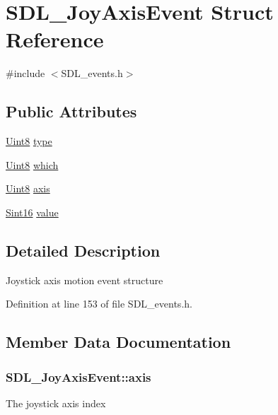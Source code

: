 \hypertarget{struct_s_d_l___joy_axis_event}{}\section{S\+D\+L\+\_\+\+Joy\+Axis\+Event Struct Reference}
\label{struct_s_d_l___joy_axis_event}


{\ttfamily \#include $<$S\+D\+L\+\_\+events.\+h$>$}

\subsection*{Public Attributes}
\begin{DoxyCompactItemize}
\item 
\hyperlink{_s_d_l__stdinc_8h_a2944638813a090aa23e62f4da842c3e2}{Uint8} \hyperlink{struct_s_d_l___joy_axis_event_ab49b38845a4326b1591f7c8fadc6e5ad}{type}
\item 
\hyperlink{_s_d_l__stdinc_8h_a2944638813a090aa23e62f4da842c3e2}{Uint8} \hyperlink{struct_s_d_l___joy_axis_event_a41a7483a5520986f340808da16e08775}{which}
\item 
\hyperlink{_s_d_l__stdinc_8h_a2944638813a090aa23e62f4da842c3e2}{Uint8} \hyperlink{struct_s_d_l___joy_axis_event_a0beac2fb161e45771c424bd0b6daeabb}{axis}
\item 
\hyperlink{_s_d_l__stdinc_8h_a9d0257032c0e146ab6121bf0122712f5}{Sint16} \hyperlink{struct_s_d_l___joy_axis_event_a53ee73e7c367934dd6edb69963be5556}{value}
\end{DoxyCompactItemize}


\subsection{Detailed Description}
Joystick axis motion event structure 

Definition at line 153 of file S\+D\+L\+\_\+events.\+h.



\subsection{Member Data Documentation}
\hypertarget{struct_s_d_l___joy_axis_event_a0beac2fb161e45771c424bd0b6daeabb}{}
\subsubsection[{axis}]{ S\+D\+L\+\_\+\+Joy\+Axis\+Event\+::axis}\label{struct_s_d_l___joy_axis_event_a0beac2fb161e45771c424bd0b6daeabb}
The joystick axis index 


